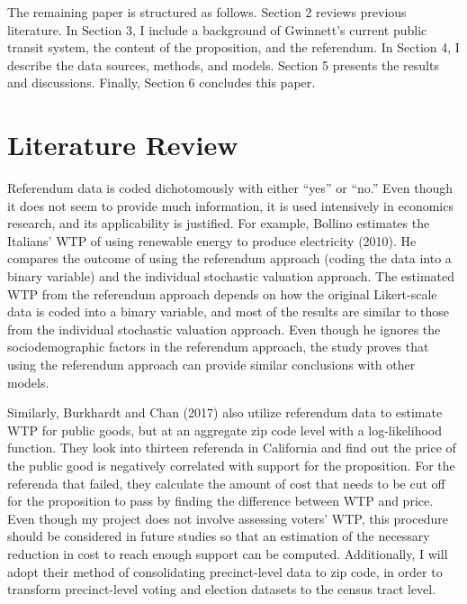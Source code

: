 \documentclass[
]{article}
\begin{document}
The remaining paper is structured as follows. Section 2 reviews previous
literature. In Section 3, I include a background of Gwinnett's current
public transit system, the content of the proposition, and the
referendum. In Section 4, I describe the data sources, methods, and
models. Section 5 presents the results and discussions. Finally, Section
6 concludes this paper.

\hypertarget{literature-review}{%
\section{Literature Review}\label{literature-review}}

Referendum data is coded dichotomously with either ``yes'' or ``no.''
Even though it does not seem to provide much information, it is used
intensively in economics research, and its applicability is justified.
For example, Bollino estimates the Italians' WTP of using renewable
energy to produce electricity (2010). He compares the outcome of using
the referendum approach (coding the data into a binary variable) and the
individual stochastic valuation approach. The estimated WTP from the
referendum approach depends on how the original Likert-scale data is
coded into a binary variable, and most of the results are similar to
those from the individual stochastic valuation approach. Even though he
ignores the sociodemographic factors in the referendum approach, the
study proves that using the referendum approach can provide similar
conclusions with other models.

Similarly, Burkhardt and Chan (2017) also utilize referendum data to
estimate WTP for public goods, but at an aggregate zip code level with a
log-likelihood function. They look into thirteen referenda in California
and find out the price of the public good is negatively correlated with
support for the proposition. For the referenda that failed, they
calculate the amount of cost that needs to be cut off for the
proposition to pass by finding the difference between WTP and price.
Even though my project does not involve assessing voters' WTP, this
procedure should be considered in future studies so that an estimation
of the necessary reduction in cost to reach enough support can be
computed. Additionally, I will adopt their method of consolidating
precinct-level data to zip code, in order to transform precinct-level
voting and election datasets to the census tract level.
\end{document}
